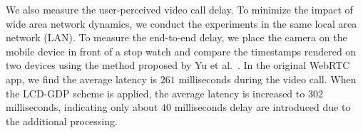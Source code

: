 We also measure the user-perceived video call delay.
To minimize the impact of wide area network dynamics, 
we conduct the experiments in the same local area network (LAN).
To measure the end-to-end delay, 
we place the camera on the mobile device in front of a stop watch
and compare the timestamps rendered on two devices using the method proposed by Yu et al.~\cite{yu2014can}. 
In the original WebRTC app, we find the average latency is $261$ milliseconds 
during the video call. When the LCD-GDP scheme is applied, the average latency
is increased to $302$ milliseconds, indicating only about $40$ milliseconds delay are
introduced due to the additional processing. 













